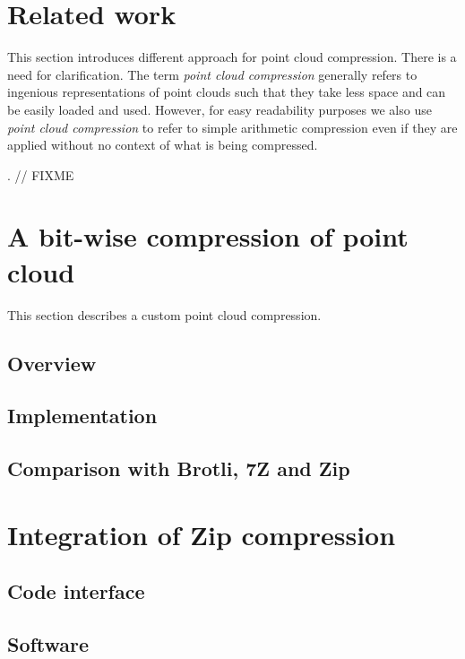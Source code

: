 \section{Related work}
\label{sc:work-compression}
This section introduces different approach for point cloud compression. There is a need for clarification. The term \emph{point cloud compression} generally refers to ingenious representations of point clouds such that they take less space and can be easily loaded and used. However, for easy readability purposes we also use \emph{point cloud compression} to refer to simple arithmetic compression even if they are applied without no context of what is being compressed.

\cite{qsplat, schnabel, gumhold, zhang}. // FIXME\\
\cite{brotli, 7zip}

\section{A bit-wise compression of point cloud}
\label{sc:custom-compression}
This section describes a custom point cloud compression.

\subsection{Overview}


\subsection{Implementation}

\subsection{Comparison with Brotli, 7Z and Zip}


\section{Integration of Zip compression}
\label{sc:integration}

\subsection{Code interface}

\subsection{\CC Software}
